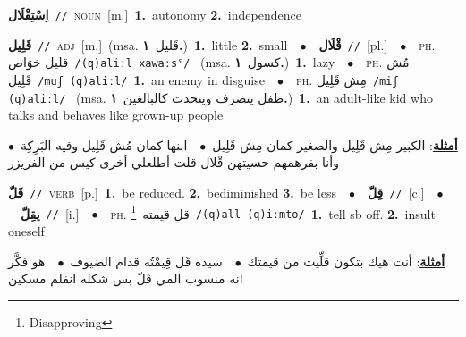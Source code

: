 \documentclass[10pt,a4paper,twoside]{article} %
\begin{document}
\begin{multicols}{2}
{\setlength\topsep{0pt}\textbf{\foreignlanguage{arabic}{اِسْتِقْلَال}}\ {\color{gray}\texttt{//}\color{black}}\ \textsc{noun}\ [m.]\ \textbf{1.}~autonomy  \textbf{2.}~independence\ } \vspace{2mm}

{\setlength\topsep{0pt}\textbf{\foreignlanguage{arabic}{قَلِيل}}\ {\color{gray}\texttt{//}\color{black}}\ \textsc{adj}\ [m.]\ \color{gray}(msa. \foreignlanguage{arabic}{قَليل}~\foreignlanguage{arabic}{\textbf{١.}})\color{black}\ \textbf{1.}~little  \textbf{2.}~small\ \ $\bullet$\ \ \setlength\topsep{0pt}\textbf{\foreignlanguage{arabic}{قْلَال}}\ {\color{gray}\texttt{//}\color{black}}\ [pl.]\ \ $\bullet$\ \ \textsc{ph.} \color{gray} \foreignlanguage{arabic}{قليل خوَاص}\color{black}\ {\color{gray}\texttt{/{\sffamily (q)aliːl xawaːsˤ}/}\color{black}}\ \color{gray} (msa. \foreignlanguage{arabic}{كسول}~\foreignlanguage{arabic}{\textbf{١.}})\color{black}\ \textbf{1.}~lazy\ \ $\bullet$\ \ \textsc{ph.} \color{gray} \foreignlanguage{arabic}{مُش قَلِيل}\color{black}\ {\color{gray}\texttt{/{\sffamily muʃ (q)aliːl}/}\color{black}}\ \textbf{1.}~an enemy in disguise\ \ $\bullet$\ \ \textsc{ph.} \color{gray} \foreignlanguage{arabic}{مِش قَلِيل}\color{black}\ {\color{gray}\texttt{/{\sffamily miʃ (q)aliːl}/}\color{black}}\ \color{gray} (msa. \foreignlanguage{arabic}{طفل يتصرف ويتحدث كالبالغين}~\foreignlanguage{arabic}{\textbf{١.}})\color{black}\ \textbf{1.}~an adult-like kid who talks and behaves like grown-up people\  \begin{flushright}\color{gray}\foreignlanguage{arabic}{\textbf{\underline{\foreignlanguage{arabic}{أمثلة}}}: الكبير مِش قَلِيل والصغير كمان مِش قَلِيل\ $\bullet$\ \  ابنها كمان مُش قَلِيل وفيه البَرِكِة\ $\bullet$\ \  وأنا بفرهمهم حسيتهن قْلال قلت أطلعلي أخرى كيس من الفريزر}\end{flushright}\color{black}} \vspace{2mm}

{\setlength\topsep{0pt}\textbf{\foreignlanguage{arabic}{قَلّ}}\ {\color{gray}\texttt{//}\color{black}}\ \textsc{verb}\ [p.]\ \textbf{1.}~be reduced.  \textbf{2.}~bediminished  \textbf{3.}~be less\ \ $\bullet$\ \ \setlength\topsep{0pt}\textbf{\foreignlanguage{arabic}{قِلّ}}\ {\color{gray}\texttt{//}\color{black}}\ [c.]\ \ $\bullet$\ \ \setlength\topsep{0pt}\textbf{\foreignlanguage{arabic}{يقِلّ}}\ {\color{gray}\texttt{//}\color{black}}\ [i.]\ \ $\bullet$\ \ \textsc{ph.} \color{gray} \foreignlanguage{arabic}{قل قيمته}\color{black}\ \footnote{Disapproving}\ {\color{gray}\texttt{/{\sffamily (q)all (q)iːmto}/}\color{black}}\ \textbf{1.}~tell sb off.  \textbf{2.}~insult oneself\  \begin{flushright}\color{gray}\foreignlanguage{arabic}{\textbf{\underline{\foreignlanguage{arabic}{أمثلة}}}: أنت هيك بتكون قلِّيت من قيمتك\ $\bullet$\ \  سيده قَل قِيمْتُه قدام الضيوف\ $\bullet$\ \  هو فكَّر انه منسوب المي قَلّ بس شكله انفلم مسكين}\end{flushright}\color{black}} \vspace{2mm}


\end{multicols}
\end{document}
